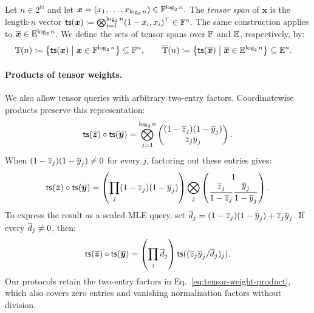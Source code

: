 \begin{definition}
\label{def:tensorspan}
Let \(n \in 2^\mathbb{N}\) and let
\(
    \bm x
    =
    (x_1,\ldots,x_{\log_2 n})
    \in{\mathbb{F}}^{\log_2 n}.
\)
The \emph{tensor span} of \(\bm x\) is the length-\(n\) vector
\(
    {\sf ts}(\bm x)
    \coloneqq
    \bigotimes_{i=1}^{\log_2 n} (1-x_i, x_i)^\top
    \in{\mathbb{F}}^n.
\)
The same construction applies to
\(\overline{\bm x}\in\mathbb{E}^{\log_2 n}\).
We define the sets of tensor spans over \({\mathbb{F}}\) and
\(\mathbb{E}\), respectively, by:
\begin{align*}
    \mathbb{T}(n)
    &\coloneqq
    \left\{
        {\sf ts}(\bm x)
        \;\middle|\;
        \bm x\in{\mathbb{F}}^{\log_2 n}
    \right\}
    \subseteq{\mathbb{F}}^n,
    \qquad
    \overline{\mathbb{T}}(n)
    \coloneqq
    \left\{
        {\sf ts}(\overline{\bm x})
        \;\middle|\;
        \overline{\bm x}\in\mathbb{E}^{\log_2 n}
    \right\}
    \subseteq\mathbb{E}^n.
\end{align*}
\end{definition}

\paragraph{Products of tensor weights.}
We also allow tensor queries with arbitrary two-entry factors.
Coordinatewise products preserve this representation:
\begin{equation}
    {\sf ts}(\overline{\bm z})\circ{\sf ts}(\overline{\bm y})
    =\bigotimes_{j=1}^{\log_2n}
    \begin{pmatrix}
        (1-\overline{z}_j)(1-\overline{y}_j)\\
        \overline{z}_j\overline{y}_j
    \end{pmatrix}.
    \label{eq:tensor-weight-product}
\end{equation}
When \((1-\overline{z}_j)(1-\overline{y}_j)\neq0\) for every \(j\),
factoring out these entries gives:
\[
    {\sf ts}(\overline{\bm z})\circ{\sf ts}(\overline{\bm y})
    =\left(\prod_j(1-\overline{z}_j)(1-\overline{y}_j)\right)
      \bigotimes_j
      \begin{pmatrix}
          1\\
          \dfrac{\overline{z}_j}{1-\overline{z}_j}
          \dfrac{\overline{y}_j}{1-\overline{y}_j}
      \end{pmatrix}.
\]
To express the result as a scaled MLE query, set
\(\overline{d}_j=(1-\overline{z}_j)(1-\overline{y}_j)+\overline{z}_j\overline{y}_j\).
If every \(\overline{d}_j\neq0\), then:
\[
    {\sf ts}(\overline{\bm z})\circ{\sf ts}(\overline{\bm y})
    =\left(\prod_j\overline{d}_j\right)
      {\sf ts}((\overline{z}_j\overline{y}_j/\overline{d}_j)_j).
\]
Our protocols retain the two-entry factors in
Eq.~\eqref{eq:tensor-weight-product}, which also covers zero
entries and vanishing normalization factors without division.

